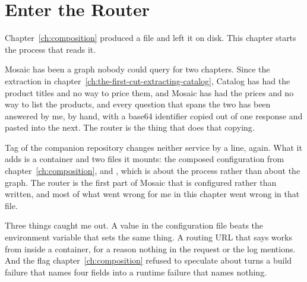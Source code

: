 \chapter{Enter the Router}
\label{ch:enter-the-router}

Chapter~\ref{ch:composition} produced a file and left it on disk. This chapter
starts the process that reads it.

Mosaic has been a graph nobody could query for two chapters. Since the
extraction in chapter~\ref{ch:the-first-cut-extracting-catalog}, Catalog has
had the product titles and no way to price them, and Mosaic has had the prices
and no way to list the products, and every question that spans the two has been
answered by me, by hand, with a base64 identifier copied out of one response and
pasted into the next. The router is the thing that does that copying.

Tag  of the companion repository changes neither service by a line,
again. What it adds is a container and two files it mounts: the composed
configuration from chapter~\ref{ch:composition}, and ,
which is about the process rather than about the graph. The router is the first
part of Mosaic that is configured rather than written, and most of what went
wrong for me in this chapter went wrong in that file.

Three things caught me out. A value in the configuration file beats the
environment variable that sets the same thing. A routing URL that says
 works from inside a container, for a reason nothing in the
request or the log mentions. And the flag
chapter~\ref{ch:composition} refused to speculate about turns a build failure
that names four fields into a runtime failure that names nothing.








